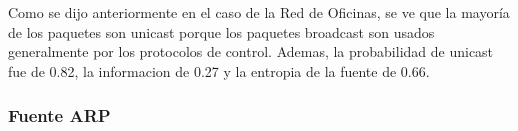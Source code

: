 \begin{figure}
	\begin{minipage}[b]{0.9\linewidth}
	\end{minipage}
\end{figure}

Como se dijo anteriormente en el caso de la Red de Oficinas, se ve que la mayor\'ia
de los paquetes son unicast porque los paquetes broadcast son usados generalmente
por los protocolos de control. Ademas, la probabilidad de unicast fue de 0.82, la
informacion de 0.27 y la entropia de la fuente de 0.66.

\subsubsection{Fuente ARP}

